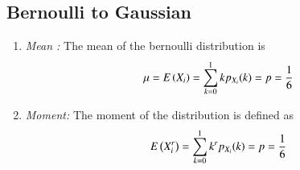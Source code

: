 \renewcommand{\thefigure}{\theenumi}
\renewcommand{\thetable}{\theenumi}

\subsection{Bernoulli to Gaussian}
\begin{enumerate}[label=\thesubsection.\arabic*
,ref=\thesection.\theenumi]


\item {\em Mean :}  The mean of the bernoulli distribution is 
\begin{align}
\mu = E\left(X_i\right)  = \sum_{k=0}^{1}kp_{X_i}(k) = p = \frac{1}{6}
\end{align}
\item {\em Moment:}  The moment of the distribution is defined as
\begin{align}
E\left(X_i^r\right)  = \sum_{k=0}^{1}k^rp_{X_i}(k) = p = \frac{1}{6}
\end{align}


\end{enumerate}

